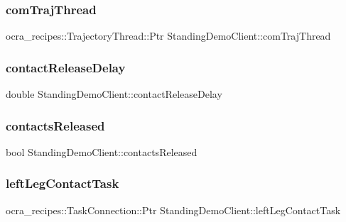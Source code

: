 \subsubsection{\texorpdfstring{com\+Traj\+Thread}{comTrajThread}}
{\footnotesize\ttfamily ocra\+\_\+recipes\+::\+Trajectory\+Thread\+::\+Ptr Standing\+Demo\+Client\+::com\+Traj\+Thread\hspace{0.3cm}{\ttfamily [private]}}

\hypertarget{classStandingDemoClient_a4a13f8bdbc84e3645c7a1ab69012c652}{}\label{classStandingDemoClient_a4a13f8bdbc84e3645c7a1ab69012c652} 
\subsubsection{\texorpdfstring{contact\+Release\+Delay}{contactReleaseDelay}}
{\footnotesize\ttfamily double Standing\+Demo\+Client\+::contact\+Release\+Delay\hspace{0.3cm}{\ttfamily [private]}}

\hypertarget{classStandingDemoClient_ac6744005797ac8071776a68b35a7da6d}{}\label{classStandingDemoClient_ac6744005797ac8071776a68b35a7da6d} 
\subsubsection{\texorpdfstring{contacts\+Released}{contactsReleased}}
{\footnotesize\ttfamily bool Standing\+Demo\+Client\+::contacts\+Released\hspace{0.3cm}{\ttfamily [private]}}

\hypertarget{classStandingDemoClient_ad5dfa4632f03e75095c810b6ff2301b4}{}\label{classStandingDemoClient_ad5dfa4632f03e75095c810b6ff2301b4} 
\subsubsection{\texorpdfstring{left\+Leg\+Contact\+Task}{leftLegContactTask}}
{\footnotesize\ttfamily ocra\+\_\+recipes\+::\+Task\+Connection\+::\+Ptr Standing\+Demo\+Client\+::left\+Leg\+Contact\+Task\hspace{0.3cm}{\ttfamily [private]}}

